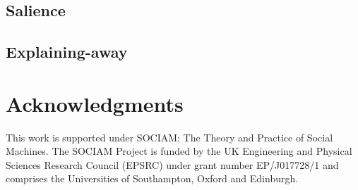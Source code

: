 \documentclass{sig-alternate}
\begin{document}
\subsection{Salience}
\subsection{Explaining-away}

\section{Acknowledgments}

This work is supported under SOCIAM: The Theory and Practice of Social
Machines.  The SOCIAM Project is funded by the UK Engineering and
Physical Sciences Research Council (EPSRC) under grant number
EP/J017728/1 and comprises the Universities of Southampton, Oxford and
Edinburgh.

%

%
%


\balancecolumns %
\end{document}
